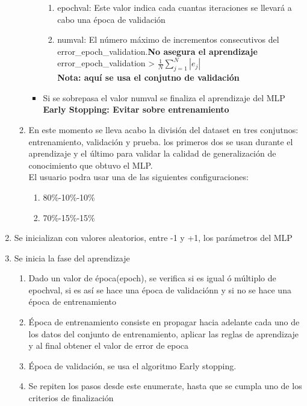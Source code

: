 \documentclass{article}
\begin{document}
\begin{enumerate}
\begin{enumerate}
\begin{itemize}
		\begin{enumerate}
			\item epochval: Este valor indica cada cuantas iteraciones se llevará a cabo una época de validación
			\item numval: El número máximo de incrementos consecutivos del error\_epoch\_validation.\textbf{No asegura el aprendizaje}\\
			error\_epoch\_validation > $\frac{1}{N}\sum_{j=1}^{N}| e_j|$\\
			\textbf{Nota: aquí se usa el conjutno de validación}
		\end{enumerate}
		\item Si se sobrepasa el valor numval se finaliza el aprendizaje del MLP\\
		\textbf{Early Stopping: Evitar sobre entrenamiento}
	\end{itemize}
	\item En este momento se lleva acabo la división del dataset en tres conjutnos: entrenamiento, validación y prueba. los primeros dos se usan durante el aprendizaje y el último para validar la calidad de generalización de conocimiento que obtuvo el MLP.\\
	El usuario podra usar una de las siguientes configuraciones:
	\begin{enumerate}
		\item 80\%-10\%-10\%
		\item 70\%-15\%-15\%
	\end{enumerate}
	\end{enumerate}
	\item Se inicializan con valores aleatorios, entre -1 y +1, los parámetros del MLP
	\item Se inicia la fase del aprendizaje
	\begin{enumerate}
		\item Dado un valor de época(epoch), se verifica si es igual ó múltiplo de epochval, si es así se hace una época de validaciónn y si no se hace una época de entrenamiento
		\item Época de entrenamiento consiste en propagar hacia adelante cada uno de los datos del conjunto de entrenamiento, aplicar las reglas de aprendizaje y al final obtener el valor de error de epoca
		\item Época de validación, se usa el algoritmo Early stopping.
		\item Se repiten los pasos desde este enumerate, hasta que se cumpla uno de los criterios de finalización
	\end{enumerate}
\end{enumerate}
\end{document}
